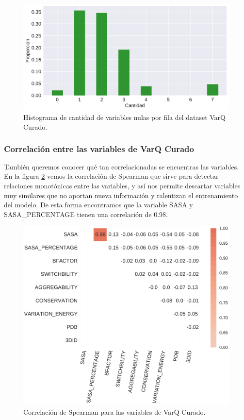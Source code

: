\begin{figure}[H]
    \centering
    \includegraphics[scale=0.6]{documents/latex/figures/3/varq/nulos_varq.pdf}
    \caption{Histograma de cantidad de variables nulas por fila del dataset VarQ Curado.}
    \label{fig:nulos_varq}
\end{figure}

\subsubsection{Correlación entre las variables de VarQ Curado}

También queremos conocer qué tan correlacionadas se encuentras las variables. En la figura \ref{fig:varq_corrplot} vemos la correlación de Spearman que sirve para detectar relaciones monotónicas entre las variables, y así nos permite descartar variables muy similares que no aportan nueva información y ralentizan el entrenamiento del modelo. De esta forma encontramos que la variable SASA y SASA\_PERCENTAGE tienen una correlación de 0.98.

\begin{figure}[H]
    \centering
    \includegraphics[scale=0.7]{documents/latex/figures/3/varq/varq_corrplot.pdf}
    \caption{Correlación de Spearman para las variables de VarQ Curado.}
    \label{fig:varq_corrplot}
\end{figure}

